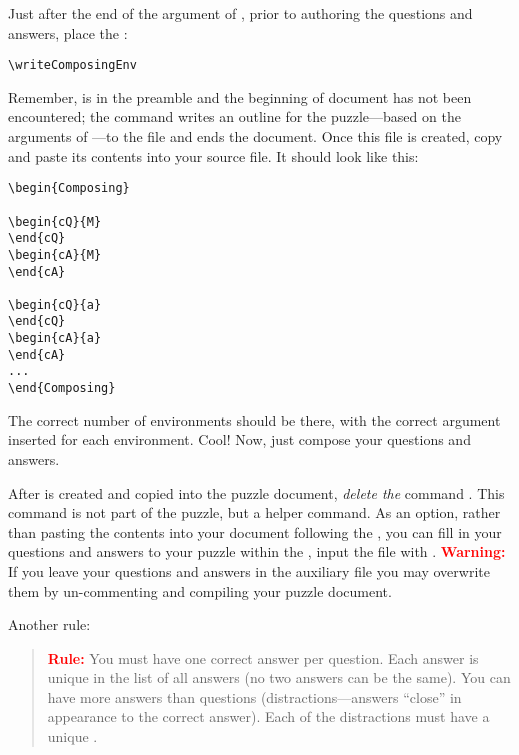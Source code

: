 \documentclass{article}
\begin{document}
\newtopic\noindent Just after the end of the
    argument of , prior to authoring the questions and
    answers, place the :
\begin{Verbatim}
\writeComposingEnv
\end{Verbatim}
Remember,  is in the preamble and the beginning of document
has not been encountered; the command writes an outline for the
puzzle---based on the arguments of ---to the file
 and ends the document. Once this file is created, copy
and paste its contents into your source file. It should look like this:
\begin{verbatim}
\begin{Composing}

\begin{cQ}{M}
\end{cQ}
\begin{cA}{M}
\end{cA}

\begin{cQ}{a}
\end{cQ}
\begin{cA}{a}
\end{cA}
...
\end{Composing}
\end{verbatim}
The correct number of environments should be there, with the correct
argument inserted for each environment. Cool! Now, just compose your
questions and answers.

After  is created and copied into the puzzle document,
\emph{delete the} command . This command is not part of
the puzzle, but a helper command. As an option, rather than pasting the
contents into your document following the , you can fill in
your questions and answers to your puzzle within the ,
input the file  with \verb!!.
\textcolor{red}{\textbf{Warning:}} If you leave your questions and answers in
the auxiliary file  you may overwrite them by
un-commenting  and compiling your puzzle document.

\newtopic\noindent Another rule:
\begin{quote}
\textbf{\textcolor{red}{Rule:}} You must have one correct answer per
    question. Each answer is unique in the list of all answers (no two
    answers can be the same). You can have more answers than questions
    (distractions---answers ``close''  in appearance to the correct
    answer). Each of the distractions must have a unique .
\end{quote}
\end{document}
